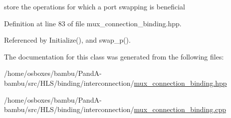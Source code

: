 store the operations for which a port swapping is beneficial 



Definition at line 83 of file mux\+\_\+connection\+\_\+binding.\+hpp.



Referenced by Initialize(), and swap\+\_\+p().



The documentation for this class was generated from the following files\+:\begin{DoxyCompactItemize}
\item 
/home/osboxes/bambu/\+Pand\+A-\/bambu/src/\+H\+L\+S/binding/interconnection/\hyperlink{mux__connection__binding_8hpp}{mux\+\_\+connection\+\_\+binding.\+hpp}\item 
/home/osboxes/bambu/\+Pand\+A-\/bambu/src/\+H\+L\+S/binding/interconnection/\hyperlink{mux__connection__binding_8cpp}{mux\+\_\+connection\+\_\+binding.\+cpp}\end{DoxyCompactItemize}
